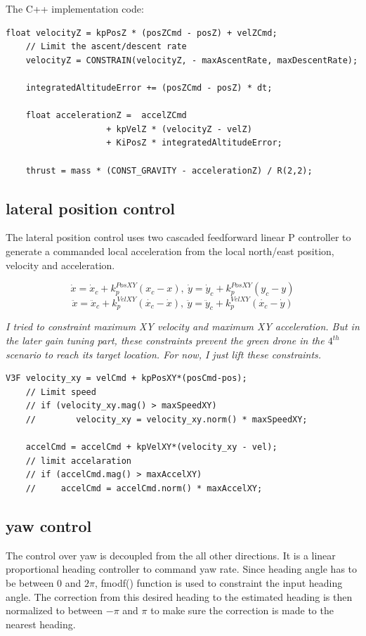 \documentclass[letterpaper]{article}
\begin{document}
The C++ implementation code:
\begin{lstlisting}[frame=single]
    float velocityZ = kpPosZ * (posZCmd - posZ) + velZCmd;
    // Limit the ascent/descent rate
    velocityZ = CONSTRAIN(velocityZ, - maxAscentRate, maxDescentRate);
    
    integratedAltitudeError += (posZCmd - posZ) * dt;
    
    float accelerationZ =  accelZCmd
                    + kpVelZ * (velocityZ - velZ)
                    + KiPosZ * integratedAltitudeError;
    
    thrust = mass * (CONST_GRAVITY - accelerationZ) / R(2,2);

\end{lstlisting}

\subsection{lateral position control} \label{control:lateral}
The lateral position control uses two cascaded feedforward linear P controller to generate a commanded local acceleration from the local north/east position, velocity and acceleration.

$$\dot{x} = \dot{x}_c  + k_{p}^{PosXY}(x_{c} - x), \:
  \dot{y} = \dot{y}_c  + k_{p}^{PosXY}(y_{c} - y)$$
$$\ddot{x} = \ddot{x}_c  + k_{p}^{VelXY}(\dot{x_{c}} - \dot{x}), \:
  \ddot{y} = \ddot{y}_c  + k_{p}^{VelXY}(\dot{x_{c}} - \dot{y})$$

\textit{I tried to constraint maximum XY velocity and maximum XY acceleration. But in the later gain tuning part, these constraints prevent the green drone in the $4^{th}$ scenario to reach its target location. For now, I just lift these constraints.}

\begin{lstlisting}[frame=single]
    V3F velocity_xy = velCmd + kpPosXY*(posCmd-pos);
    // Limit speed
    // if (velocity_xy.mag() > maxSpeedXY)
    //        velocity_xy = velocity_xy.norm() * maxSpeedXY;
    
    accelCmd = accelCmd + kpVelXY*(velocity_xy - vel);
    // limit accelaration
    // if (accelCmd.mag() > maxAccelXY)
    //     accelCmd = accelCmd.norm() * maxAccelXY;
\end{lstlisting}

\subsection{yaw control} \label{control:yaw}
The control over yaw is decoupled from the all other directions. It is a linear proportional heading controller to command yaw rate. Since heading angle has to be between 0 and $2\pi$, fmodf() function is used to constraint the input heading angle. The correction from this desired heading to the estimated heading is then normalized to between $-\pi$ and $\pi$ to make sure the correction is made to the nearest heading. 
\end{document}
